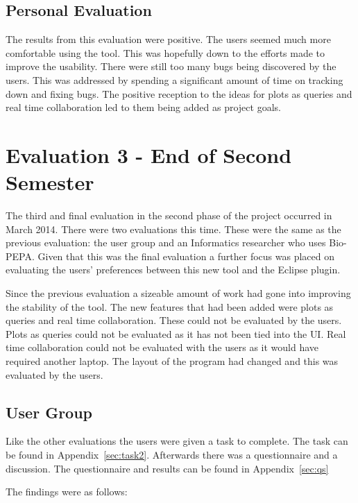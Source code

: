 \subsection{Personal Evaluation}

The results from this evaluation were positive.  The users seemed much more comfortable using the tool.  This was hopefully down to the efforts made to improve the usability.  There were still too many bugs being discovered by the users.  This was addressed by spending a significant amount of time on tracking down and fixing bugs.  The positive reception to the ideas for plots as queries and real time collaboration led to them being added as project goals.

\section{Evaluation 3 - End of Second Semester}
\label{sec:eval3}

The third and final evaluation in the second phase of the project occurred in March 2014.  There were two evaluations this time.  These were the same as the previous evaluation: the user group and an Informatics researcher who uses Bio-PEPA.  Given that this was the final evaluation a further focus was placed on evaluating the users' preferences between this new tool and the Eclipse plugin.

Since the previous evaluation a sizeable amount of work had gone into improving the stability of the tool.  The new features that had been added were plots as queries and real time collaboration.  These could not be evaluated by the users. Plots as queries could not be evaluated as it has not been tied into the \ac{UI}.  Real time collaboration could not be evaluated with the users as it would have required another laptop.  The layout of the program had changed and this was evaluated by the users.

\subsection{User Group}

Like the other evaluations the users were given a task to complete.  The task can be found in Appendix~\ref{sec:task2}. Afterwards there was a questionnaire and a discussion.  The questionnaire and results can be found in Appendix~\ref{sec:qs}

The findings were as follows:

